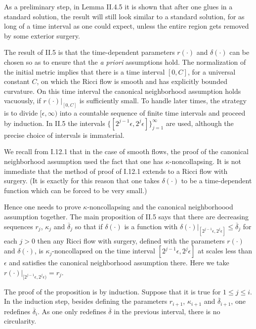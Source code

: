 \documentclass[12pt]{amsart}
\numberwithin{equation}{section}
\theoremstyle{plain}
\theoremstyle{definition}
\theoremstyle{remark}
\begin{document}
As a preliminary step, in Lemma II.4.5 it is shown that after one glues in a standard
solution, the result will still look similar to a standard solution, for as long of
a time interval as one could expect, unless the entire region gets removed by some
exterior surgery.

The result of II.5 is that the time-dependent
parameters $r(\cdot)$ and $\delta(\cdot)$ can be
chosen so as to ensure that the {\it a priori} assumptions hold.
The normalization of the initial metric implies that there is a time
interval $[0, C]$, for a universal constant $C$, on which the
Ricci flow is smooth and has explicitly bounded curvature.
On this time interval the canonical neighborhood assumption
holds vacuously, if $r(\cdot) \big|_{[0,C]}$ is sufficiently small.
To handle later times, the strategy is to divide $[\epsilon, \infty)$ into 
a countable sequence of finite time intervals and proceed by induction.
In II.5 the intervals $\{[2^{j-1} \epsilon, 2^j \epsilon]\}_{j=1}^\infty$ are used, 
although the precise choice of intervals is immaterial.  

We recall from I.12.1 that
in the case of smooth flows, the proof of the canonical neighborhood assumption
used the fact that one has $\kappa$-noncollapsing. It is not immediate that the
method of proof of I.12.1 extends to a Ricci flow with surgery. 
(It is exactly for this reason that one takes $\delta(\cdot)$ to be a 
time-dependent function which can be forced to be very small.)

Hence one needs to prove $\kappa$-noncollapsing and
the canonical neighborhoood assumption together. The main proposition of
II.5 says that there are decreasing sequences $r_j$, $\kappa_j$ and
$\overline{\delta}_j$ so that if $\delta(\cdot)$ is a function with
$\delta(\cdot) \big|_{[2^{j-1} \epsilon, 2^j \epsilon]} \le \overline{\delta}_j$ 
for each $j > 0$ then any Ricci flow with surgery, defined with the
parameters $r(\cdot)$ and $\delta(\cdot)$, is $\kappa_j$-noncollapsed on
the time interval $[2^{j-1} \epsilon, 2^j \epsilon]$ at scales less than
$\epsilon$ and satisfies the
canonical neighborhood assumption there. Here we take
$r(\cdot) \big|_{[2^{j-1} \epsilon, 2^j \epsilon)} = r_j$.

The proof of the proposition is by induction.  Suppose that it is true for
$1 \le j \le i$. In the induction step, 
besides defining the parameters $r_{i+1}$, $\kappa_{i+1}$ and
$\overline{\delta}_{i+1}$, one redefines $\overline{\delta}_i$. As one
only redefines $\overline{\delta}$ in the previous interval, there is no
circularity. 
\end{document}
